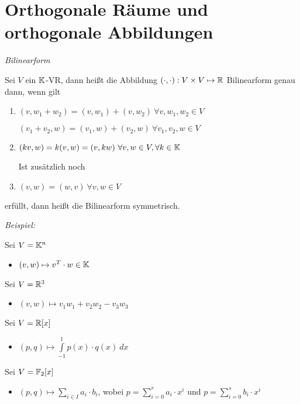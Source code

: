 \section{Orthogonale Räume und orthogonale Abbildungen}


\begin{mydef} \label{Bilinearform} \textit{Bilinearform}

        Sei $V$ ein $\mathbb{K}$-VR, dann heißt die Abbildung $(\cdot , \cdot ):V \times V \mapsto \mathbb{R}$ Bilinearform genau dann, wenn gilt
        \begin{enumerate}
                \item $(v, w_1 + w_2) = (v, w_1) + (v, w_2) \ \forall v, w_1, w_2 \in V$

                        $(v_1+v_2,w)=(v_1,w) + (v_2,w) \ \forall v_1,v_2,w \in V$
                \item $(k v,w) = k(v,w) = (v, k w) \ \forall v, w \in V, \forall k \in \mathbb{K}$

                Ist zusätzlich noch
                \item $(v,w) = (w,v) \ \forall v ,w \in V$
        \end{enumerate}
        erfüllt, dann heißt die Bilinearform symmetrisch.
\end{mydef}

\textit{Beispiel:}

Sei $V = \mathbb{K}^n$
\begin{itemize}
    \item $(v,w) \mapsto v^T \cdot w \in \mathbb{K}$
\end{itemize}
Sei $V = \mathbb{R}^3$
\begin{itemize}
    \item $(v,w) \mapsto v_1 w_1 + v_2 w_2 - v_3 w_3$
\end{itemize}
Sei $V = \mathbb{R}[x]$
\begin{itemize}
    \item $(p,q) \mapsto \int\limits_{-1}^1 p(x) \cdot q(x) \ dx$
\end{itemize}
Sei $V=\mathbb{F}_2[x]$
\begin{itemize}
    \item $(p,q) \mapsto \sum\limits_{i \in I} a_i \cdot b_i$, wobei $p = \sum\limits_{i = 0}^r a_i \cdot x^i$ und $p = \sum\limits_{i = 0}^s b_i \cdot x^i$
\end{itemize}

